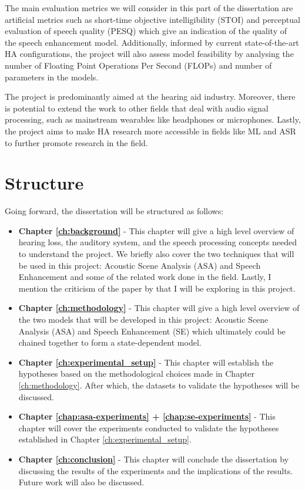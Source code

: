 \documentclass[logo,bsc,singlespacing,parskip,online]{infthesis}
\begin{document}
The main evaluation metrics we will consider in this part of the dissertation 
are artificial metrics such as short-time objective intelligibility (STOI) and perceptual evaluation of speech quality (PESQ) 
which give an indication of the quality of the speech enhancement model.
Additionally, informed by current state-of-the-art HA configurations, the project will also assess model feasibility by analysing the number of Floating Point Operations Per Second (FLOPs) and number of parameters
in the models.

The project is predominantly aimed at the hearing aid industry. 
Moreover, there is potential to extend the work to other fields that deal with audio signal processing,
such as mainstream wearables like headphones or microphones. Lastly, the project aims to make HA research more accessible 
in fields like ML and ASR to further promote research in the field.


\section{Structure}
Going forward, the dissertation will be structured as follows:
\begin{itemize}  
   \item \textbf{Chapter \ref{ch:background}} - This chapter will give a high level overview of hearing loss, the auditory system, and the speech processing concepts needed to understand the project.
   We briefly also cover the two techniques that will be used in this project: Acoustic Scene Analysis (ASA) and Speech Enhancement
   and some of the related work done in the field. Lastly, I mention the criticism of the paper by \citet{Huwel2020HearDS} 
   that I will be exploring in this project.
   \item \textbf{Chapter \ref{ch:methodology}} - This chapter will give a high level overview of the two models that will be developed in this project: Acoustic Scene Analysis (ASA) and Speech Enhancement (SE)
   which ultimately could be chained together to form a state-dependent model.
   \item \textbf{Chapter \ref{ch:experimental_setup}} - This chapter will establish the hypotheses based on the methodological choices made in Chapter \ref{ch:methodology}. After which, the datasets to 
   validate the hypotheses will be discussed.
   \item \textbf{Chapter \ref{chap:asa-experiments} + \ref{chap:se-experiments}} - This chapter will cover the experiments conducted to validate the hypotheses established in Chapter \ref{ch:experimental_setup}.
   \item \textbf{Chapter \ref{ch:conclusion}} - This chapter will conclude the dissertation by discussing the results of the experiments and the implications of the results. Future work will also be discussed.
\end{itemize}
 
\end{document}

